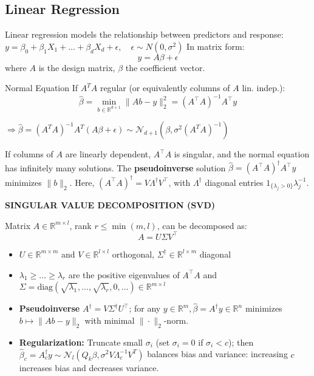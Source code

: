 \documentclass[a4paper,10pt]{article}
\newenvironment{myitemize}
{\vspace{-0.25cm}\begin{itemize}}
{\end{itemize}}
\def\R{\mathbb{R}}
\newcommand{\subtitle}[1]{\vspace{0.25cm}\begin{normalsize}\textbf{\textcolor{gray!150}{\uppercase{#1}}}\end{normalsize}}
\begin{document}
\begin{small}
\section{Linear Regression}

Linear regression models the relationship between predictors and response:
\(
y = \beta_0 + \beta_1 X_1 + \dots + \beta_d X_d + \epsilon, \quad \epsilon \sim N(0, \sigma^2)
\)
In matrix form:
\[
y = A\beta + \epsilon
\]
where \( A \) is the design matrix, \( \beta \) the coefficient vector.

\begin{subbox}{Normal Equation}
If $A^TA$ regular (or equivalently columns of $A$ lin. indep.):
\[
\hat{\beta} = \min_{b \in \mathbb{R}^{d+1}} \|A b - y\|_2^2
 = (A^\top A)^{-1} A^\top y
\]
\end{subbox}
$\Rightarrow \hat{\beta} = (A^T A)^{-1} A^T (A \beta + \epsilon) \sim \mathcal{N}_{d+1} \left( \beta, \sigma^2 (A^T A)^{-1} \right)$

If columns of \( A \) are linearly dependent, \( A^\top A \) is singular, and the normal equation has infinitely many solutions. The \textbf{pseudoinverse} solution \(\hat{\beta} = (A^\top A)^{\dagger} A^\top y\) minimizes \( \| b \|_2 \). Here, \((A^\top A)^{\dagger} = V \Lambda^{\dagger} V^\top\), with \(\Lambda^{\dagger}\) diagonal entries \(1_{\{\lambda_j > 0\}} \lambda_j^{-1}\).


\subtitle{Singular Value Decomposition (SVD)}

Matrix \( A \in \R^{m \times l}\), rank $r \leq \min(m,l)$, can be decomposed as:
\[
A = U \Sigma V^\top 
\]

\begin{myitemize}
    \item $U \in \R^{m \times m}$ and $V\in \R^{l \times l}$ orthogonal, $\Sigma^\dagger \in \R^{l \times m}$ diagonal
    \item $\lambda_1 \geq ... \geq \lambda_r$ are the positive eigenvalues of $A^\top A$ and $\Sigma = \text{diag}(\sqrt{\lambda_1}, ..., \sqrt{\lambda_r}, 0, ...) \in \R^{m \times l}$
    \item \textbf{Pseudoinverse} $A^\dagger = V \Sigma^\dagger U^\top$; for any $y \in \mathbb{R}^m, \hat{\beta} = A^{\dagger} y \in \mathbb{R}^n$ minimizes $b \mapsto \|A b - y\|_2$ with minimal $\|\cdot\|_2$-norm.
    \item \textbf{Regularization:} Truncate small \(\sigma_i\) (set \(\sigma_i = 0\) if \(\sigma_i < c\)); then \(\hat{\beta}_c = A_c^\dagger y \sim \mathcal{N}_l \left( Q_k \beta, \sigma^2 V \Lambda_c^{-1} V^T \right)\) balances bias and variance: increasing \( c \) increases bias and decreases variance.
\end{myitemize}


\end{small}
\end{document}

